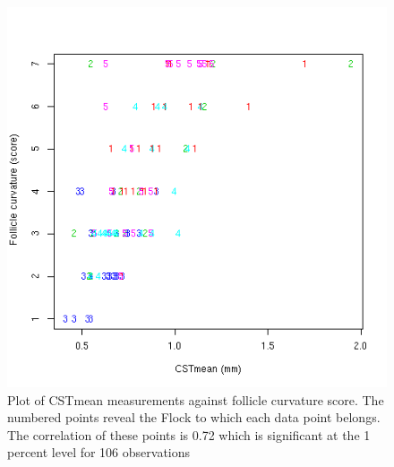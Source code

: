 %

\begin{figure}[!h]
  \centering
  \includegraphics[width=1.0\textwidth]{CSTFc.png}
  \caption{Plot of CSTmean measurements against follicle curvature score. The numbered points reveal the Flock to which each data point belongs. The correlation of these points is 0.72 which is significant at the 1 percent level for 106 observations}
  \label{fig:CSTFc}
\end{figure}

%

